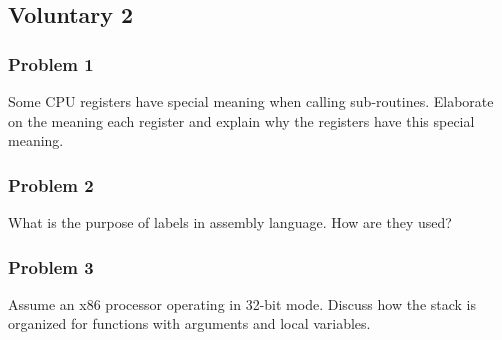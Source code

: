 
\subsection*{Voluntary 2}
\subsubsection*{Problem 1}
Some CPU registers have special meaning when calling sub-routines. Elaborate on the meaning each register and explain why the registers have this special meaning.

\subsubsection*{Problem 2}
What is the purpose of labels in assembly language. How are they used?

\subsubsection*{Problem 3}
Assume an x86 processor operating in 32-bit mode. Discuss how the stack is organized for functions with arguments and local variables.